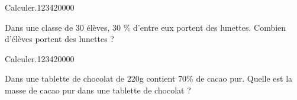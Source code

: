 \begin{pageAD}
\begin{ExoCad}{Calculer.}{1234}{2}{0}{0}{0}{0}

Dans une classe de 30 élèves, 30 \% d'entre eux portent des lunettes. Combien d'élèves portent des lunettes ?
 

\end{ExoCad}

\begin{ExoCad}{Calculer.}{1234}{2}{0}{0}{0}{0}

Dans une tablette de chocolat de $220$g contient 70\% de cacao pur. Quelle est la masse de cacao pur dans une tablette de chocolat ?
 
\end{ExoCad}

\end{pageAD} 
